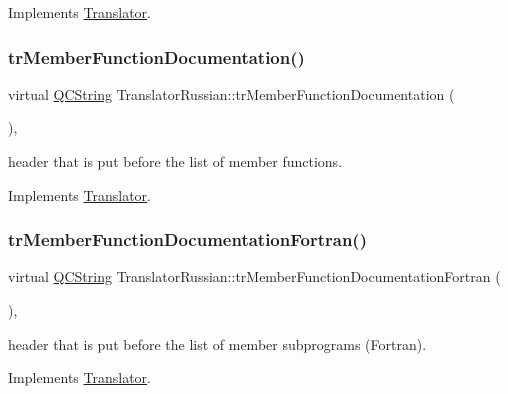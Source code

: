 Implements \mbox{\hyperlink{class_translator}{Translator}}.

\mbox{\label{class_translator_russian_ae02abf3ab260d83cf414bea5369519bf}} 
\subsubsection{\texorpdfstring{trMemberFunctionDocumentation()}{trMemberFunctionDocumentation()}}
{\footnotesize\ttfamily virtual \mbox{\hyperlink{class_q_c_string}{Q\+C\+String}} Translator\+Russian\+::tr\+Member\+Function\+Documentation (\begin{DoxyParamCaption}{ }\end{DoxyParamCaption})\hspace{0.3cm}{\ttfamily [inline]}, {\ttfamily [virtual]}}

header that is put before the list of member functions. 

Implements \mbox{\hyperlink{class_translator}{Translator}}.

\mbox{\label{class_translator_russian_a5595a197b0d7c3838c45618a1caea593}} 
\subsubsection{\texorpdfstring{trMemberFunctionDocumentationFortran()}{trMemberFunctionDocumentationFortran()}}
{\footnotesize\ttfamily virtual \mbox{\hyperlink{class_q_c_string}{Q\+C\+String}} Translator\+Russian\+::tr\+Member\+Function\+Documentation\+Fortran (\begin{DoxyParamCaption}{ }\end{DoxyParamCaption})\hspace{0.3cm}{\ttfamily [inline]}, {\ttfamily [virtual]}}

header that is put before the list of member subprograms (Fortran). 

Implements \mbox{\hyperlink{class_translator}{Translator}}.

